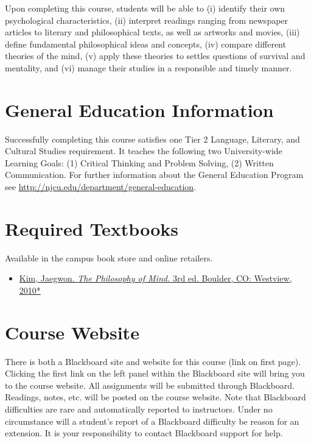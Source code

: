 \documentclass[article,oneside]{memoir}
\begin{document}
Upon completing this course, students will be able to  (i) identify their own psychological characteristics, (ii) interpret readings ranging from newspaper articles to literary and philosophical texts, as well as artworks and movies, (iii) define fundamental philosophical ideas and concepts, (iv) compare different theories of the mind, (v) apply these theories to settles questions of survival and mentality,  and  (vi) manage their studies in a responsible and timely manner. 





\section{General Education Information} 
Successfully completing this course satisfies one Tier 2 Language, Literary, and Cultural Studies requirement. It teaches the following two University-wide Learning Goals: (1) Critical Thinking and Problem Solving, (2) Written Communication. For further information about the General Education Program see \href{http://njcu.edu/department/general-education/}{http://njcu.edu/department/general-education}.


\section{Required Textbooks}
Available in the campus book store and online retailers.


\begin{itemize}
\item \href{https://www.amazon.com/Philosophy-Mind-Jaegwon-Kim/dp/0813344581/ref=sr_1_1?ie=UTF8&qid=1484684648&sr=8-1&keywords=kim+philosophy+of+mind}{Kim, Jaegwon. \emph{The Philosophy of Mind.} 3rd ed. Boulder, CO: Westview, 2010*}

\end{itemize}


\section{Course Website}
There is both a Blackboard site and website for this course (link on first page). Clicking the first link on the left panel within the Blackboard site will bring you to the course website. All assignments will be submitted through Blackboard. Readings, notes, etc. will be posted on the course website. Note that Blackboard difficulties are rare and automatically reported to instructors. Under no circumstance will a student's report of a Blackboard difficulty be reason for an extension. It is your responsibility to contact Blackboard support for help.
\end{document}
